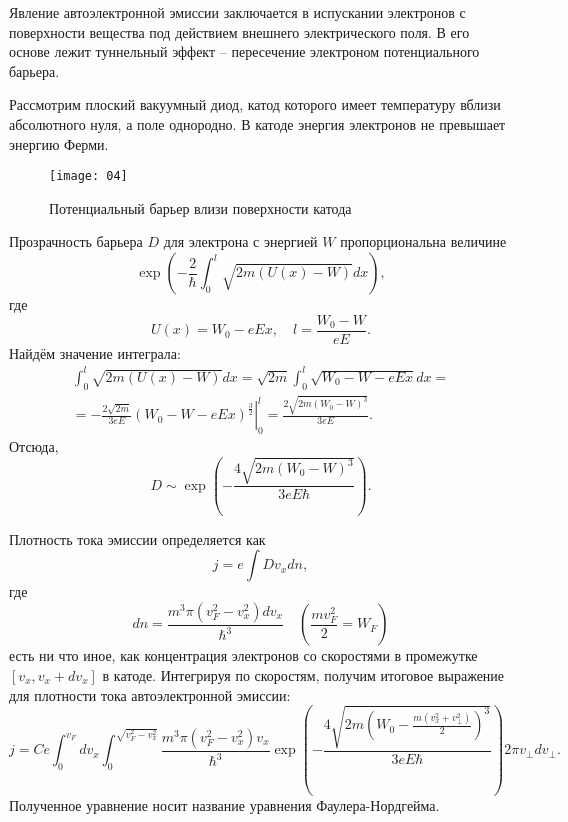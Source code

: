 Явление автоэлектронной эмиссии заключается в испускании электронов с
поверхности вещества под действием внешнего электрического поля. В его основе
лежит туннельный эффект -- пересечение электроном потенциального барьера.

Рассмотрим плоский вакуумный диод, катод которого имеет температуру вблизи
абсолютного нуля, а поле однородно. В катоде энергия электронов не
превышает энергию Ферми.
\begin{figure}[h!]
    \center
    \texttt{[image: 04]}
    \caption{Потенциальный барьер влизи поверхности катода}
\end{figure}


Прозрачность барьера \( D \) для электрона с энергией \( W \) пропорциональна
величине
\[
    \exp\left(-\frac{2}{\hbar}\int_0^l\sqrt{2m(U(x)-W)}dx\right),
\]
где
\[
    U(x) = W_0 - eEx,\quad l = \frac{W_0-W}{eE}.
\]
Найдём значение интеграла:
\begin{gather*}
    \int_0^l\sqrt{2m(U(x)-W)}dx = \sqrt{2m}\int_0^l\sqrt{W_0-W-eEx}dx =\\
    =-\frac{2\sqrt{2m}}{3eE}\left.(W_0-W-eEx)^\frac{3}{2}\right|_0^l =
    \frac{2\sqrt{2m(W_0-W)^3}}{3eE}.
\end{gather*}
Отсюда,
\[
    D\sim\exp\left(-\frac{4\sqrt{2m(W_0-W)^3}}{3eE\hbar}\right).
\]

Плотность тока эмиссии определяется как
\[
    j = e\int Dv_xdn,
\]
где
\[
    dn = \frac{m^3\pi(v_F^2-v_x^2)dv_x}{\hbar^3}
    \quad \left(\frac{mv_F^2}{2} = W_F\right)
\]
есть ни что иное, как концентрация электронов со скоростями в промежутке
\( [v_x, v_x+dv_x] \) в катоде. Интегрируя по скоростям, получим итоговое
выражение для плотности тока автоэлектронной эмиссии:
\[
    j = C e \int_0^{v_F}dv_x\int_0^{\sqrt{v_F^2-v_x^2}}
    \frac{m^3\pi(v_F^2-v_x^2)v_x}{\hbar^3}
    \exp\left(
        -\frac{4\sqrt{2m\left(W_0-\frac{m(v_x^2+v_\perp^2)}{2}\right)^3}}
              {3eE\hbar}
    \right)
    2\pi v_\perp dv_\perp.
\]
Полученное уравнение носит название уравнения Фаулера-Нордгейма.

